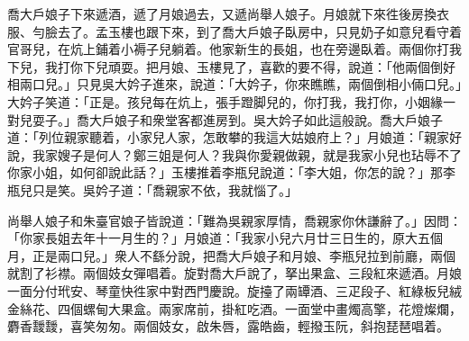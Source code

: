 喬大戶娘子下來遞酒，遞了月娘過去，又遞尚舉人娘子。月娘就下來徃後房換衣服、勻臉去了。孟玉樓也跟下來，到了喬大戶娘子臥房中，只見奶子如意兒看守着官哥兒，在炕上鋪着小褥子兒躺着。他家新生的長姐，也在旁邊臥着。兩個你打我下兒，我打你下兒頑耍。{}把月娘、玉樓見了，喜歡的要不得，說道：「他兩個倒好相兩口兒。」只見吳大妗子進來，說道：「大妗子，你來瞧瞧，兩個倒相小倆口兒。」大妗子笑道：「正是。孩兒每在炕上，張手蹬脚兒的，你打我，我打你，小姻緣一對兒耍子。」喬大戶娘子和衆堂客都進房到。吳大妗子如此這般說。喬大戶娘子道：「列位親家聽着，小家兒人家，怎敢攀的我這大姑娘府上？」月娘道：「親家好說，我家嫂子是何人？鄭三姐是何人？我與你愛親做親，就是我家小兒也玷辱不了你家小姐，如何卻說此話？」玉樓推着李瓶兒說道：「李大姐，你怎的說？」那李瓶兒只是笑。{}吳妗子道：「喬親家不依，我就惱了。」

尚舉人娘子和朱臺官娘子皆說道：「難為吳親家厚情，喬親家你休謙辭了。」因問：「你家長姐去年十一月生的？」月娘道：「我家小兒六月廿三日生的，原大五個月，正是兩口兒。」衆人不繇分說，把喬大戶娘子和月娘、李瓶兒拉到前廳，兩個就割了衫襟。兩個妓女彈唱着。旋對喬大戶說了，拏出果盒、三段紅來遞酒。月娘一面分付玳安、琴童快徃家中對西門慶說。旋擡了兩罈酒、三疋段子、紅綠板兒絨金絲花、四個螺甸大果盒。兩家席前，掛紅吃酒。一面堂中畫燭高擎，花燈燦爛，麝香靉靉，喜笑匆匆。兩個妓女，啟朱唇，露皓齒，輕撥玉阮，斜抱琵琶唱着。

